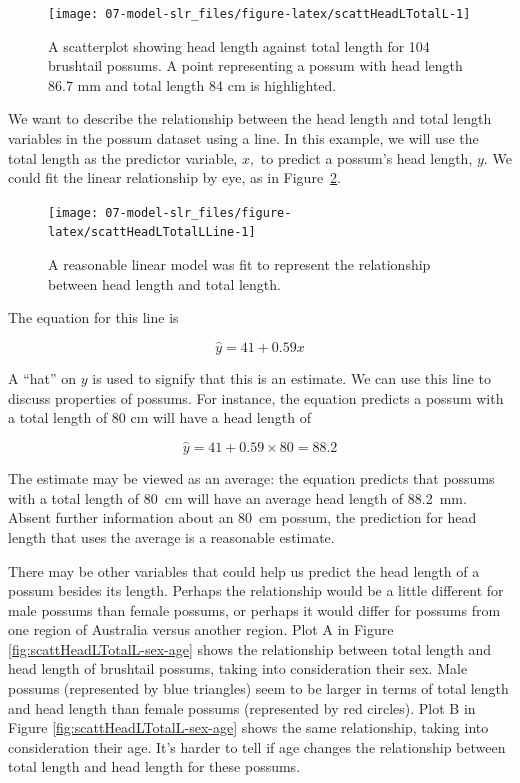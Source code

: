 \documentclass[
  10pt,
  openany]{book}
\begin{document}
\begin{figure}[h]

{\centering \texttt{[image: 07-model-slr\_files/figure-latex/scattHeadLTotalL-1]} 

}

\caption{A scatterplot showing head length against total length for 104 brushtail possums. A point representing a possum with head length 86.7 mm and total length 84 cm is highlighted.}\label{fig:scattHeadLTotalL}
\end{figure}

We want to describe the relationship between the head length and total length variables in the possum dataset using a line.
In this example, we will use the total length as the predictor variable, \(x,\) to predict a possum's head length, \(y.\) We could fit the linear relationship by eye, as in Figure~\ref{fig:scattHeadLTotalLLine}.

\begin{figure}[h]

{\centering \texttt{[image: 07-model-slr\_files/figure-latex/scattHeadLTotalLLine-1]} 

}

\caption{A reasonable linear model was fit to represent the relationship between head length and total length.}\label{fig:scattHeadLTotalLLine}
\end{figure}

The equation for this line is

\[\hat{y} = 41 + 0.59x\]

A ``hat'' on \(y\) is used to signify that this is an estimate.
We can use this line to discuss properties of possums.
For instance, the equation predicts a possum with a total length of 80 cm will have a head length of

\[\hat{y} = 41 + 0.59 \times 80 = 88.2\]

The estimate may be viewed as an average: the equation predicts that possums with a total length of 80~cm will have an average head length of 88.2~mm.
Absent further information about an 80~cm possum, the prediction for head length that uses the average is a reasonable estimate.

There may be other variables that could help us predict the head length of a possum besides its length.
Perhaps the relationship would be a little different for male possums than female possums, or perhaps it would differ for possums from one region of Australia versus another region.
Plot A in Figure \ref{fig:scattHeadLTotalL-sex-age} shows the relationship between total length and head length of brushtail possums, taking into consideration their sex.
Male possums (represented by blue triangles) seem to be larger in terms of total length and head length than female possums (represented by red circles).
Plot B in Figure \ref{fig:scattHeadLTotalL-sex-age} shows the same relationship, taking into consideration their age.
It's harder to tell if age changes the relationship between total length and head length for these possums.
\end{document}
